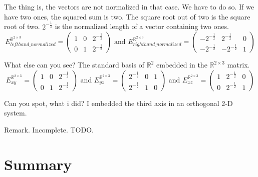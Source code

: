 \documentclass[a4paper]{article}
\begin{document}
The thing is, the vectors are not normalized in that case. We have to do so. If we have two ones, the squared sum is two. The square root out of two is the square root of two. $2^{-\frac12}$ is the normalized length of a vector containing two ones.\\

\begin{displaymath}
    E^{\mathbb{R}^{2\times{3}}}_{lefthand\_normalized} = \begin{pmatrix}1&0&2^{-\frac12}\\0&1&2^{-\frac12}\end{pmatrix} \mbox{ and }
    E^{\mathbb{R}^{2\times{3}}}_{righthand\_normalized} = \begin{pmatrix}-2^{-\frac12}&2^{-\frac12}&0\\-2^{-\frac12}&-2^{-\frac12}&1\end{pmatrix}
\end{displaymath}

What else can you see? The standard basis of $\mathbb{R}^{2}$ embedded in the $\mathbb{R}^{2\times3}$ matrix.\\

\begin{displaymath}
    E^{\mathbb{R}^{2\times{3}}}_{xy} = \begin{pmatrix}1&0&2^{-\frac12}\\0&1&2^{-\frac12}\end{pmatrix} \mbox{ and }
    E^{\mathbb{R}^{2\times{3}}}_{yz} = \begin{pmatrix}2^{-\frac12}&0&1\\2^{-\frac12}&1&0\end{pmatrix} \mbox{ and }
    E^{\mathbb{R}^{2\times{3}}}_{xz} = \begin{pmatrix}1&2^{-\frac12}&0\\0&2^{-\frac12}&1\end{pmatrix} 
\end{displaymath}

Can you spot, what i did? I embedded the third axis in an orthogonal 2-D system.

Remark. Incomplete. TODO.

\section{Summary}
\end{document}
